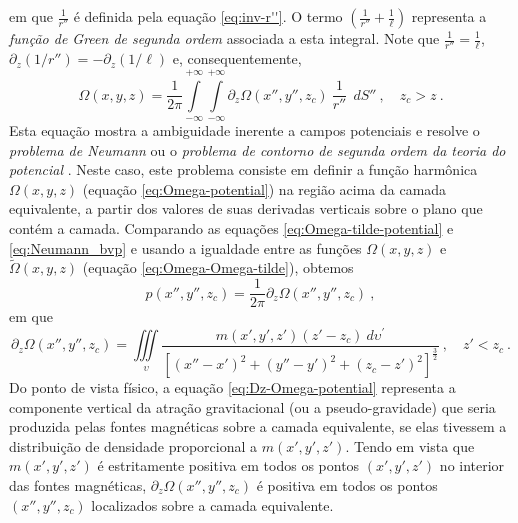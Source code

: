 em que $\frac{1}{r''}$ é definida pela equação \ref{eq:inv-r''}. O termo $\left( \frac{1}{r''} + \frac{1}{\ell} \right)$ 
representa a \textit{função de Green de segunda ordem} \citep[][ p. 246]{kellogg1967} associada a esta integral. 
Note que $\frac{1}{r''} = \frac{1}{\ell}$, $\partial_{z} (1/r'') = -\partial_{z} (1/\ell)$ e, consequentemente, 
\begin{equation}
\Omega(x, y, z) = \frac{1}{2\pi}
\int\limits_{-\infty}^{+\infty}\int\limits_{-\infty}^{+\infty}
\partial_{z} \Omega(x'', y'', z_{c}) \: \frac{1}{r''} 
\:\: dS'' \: , \quad z_{c} > z \: .
\label{eq:Neumann_bvp}
\end{equation}
Esta equação mostra a ambiguidade inerente a campos potenciais \citep{roy1962} e resolve 
o \textit{problema de Neumann} ou o \textit{problema de contorno de segunda ordem da teoria do potencial} 
\citep[][ p. 246]{kellogg1967}. Neste caso, este problema consiste em definir a função harmônica 
$\Omega(x, y, z)$ (equação \ref{eq:Omega-potential}) na região acima da camada equivalente, 
a partir dos valores de suas derivadas verticais sobre o plano que contém a camada. 
Comparando as equações \ref{eq:Omega-tilde-potential} e \ref{eq:Neumann_bvp} e usando a igualdade 
entre as funções $\Omega(x, y, z)$ e $\tilde{\Omega}(x, y, z)$ (equação \ref{eq:Omega-Omega-tilde}), 
obtemos 
\begin{equation}
p(x'', y'', z_{c}) = \frac{1}{2\pi} \partial_{z} \Omega(x'', y'', z_{c}) \: ,
\label{eq:positivity_prop}
\end{equation}
em que
\begin{equation}
\partial_{z} \Omega(x'', y'', z_{c}) = \iiint\limits_{\upsilon} 
\frac{m(x', y', z') (z' - z_{c}) \: 
d\upsilon^{\prime}}
{\left[ (x''-x')^2 + (y''-y')^2 + (z_{c}-z')^2 \right]^{\frac{3}{2}}} \: , \quad z' < z_{c} \: .
\label{eq:Dz-Omega-potential}
\end{equation}
Do ponto de vista físico, a equação \ref{eq:Dz-Omega-potential} representa a componente vertical da atração 
gravitacional (ou a pseudo-gravidade) que seria produzida pelas fontes magnéticas sobre a camada equivalente, 
se elas tivessem a distribuição de densidade proporcional a $m(x', y', z')$. Tendo em vista que 
$m(x', y', z')$ é estritamente positiva em todos os pontos $(x', y', z')$ no interior das fontes magnéticas, 
$\partial_{z} \Omega(x'', y'', z_{c})$ é positiva em todos os pontos $(x'', y'', z_{c})$ localizados sobre 
a camada equivalente.

